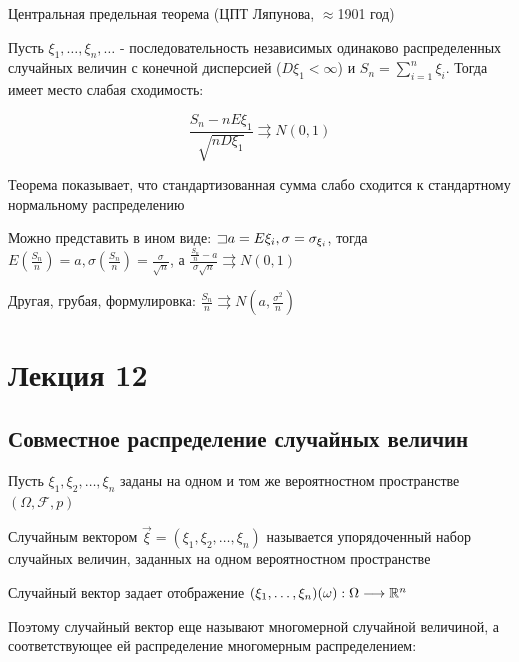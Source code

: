 \documentclass[12pt]{article}
\begin{document}
    \hypertarget{centrallimittheorem}{}

    \begin{MyTheorem}
        \Ths Центральная предельная теорема (ЦПТ Ляпунова, $\approx$1901 год)

        Пусть $\xi_1, \dots, \xi_n, \dots$ - последовательность независимых одинаково распределенных случайных величин
        с конечной дисперсией ($D\xi_1 < \infty$) и $S_n = \sum_{i = 1}^n \xi_i$. Тогда имеет место слабая сходимость:

        \[\frac{S_n - nE\xi_1}{\sqrt{nD\xi_1}} \rightrightarrows N(0, 1)\]
    \end{MyTheorem}

    Теорема показывает, что стандартизованная сумма слабо сходится к стандартному нормальному распределению

    \Nota Можно представить в ином виде: $\mathord{\sqsupset} a = E\xi_i, \sigma = \sigma_{\xi_i}$, тогда $E\left(\frac{S_n}{n}\right) = a, \sigma\left(\frac{S_n}{n}\right) = \frac{\sigma}{\sqrt{n}}$, а $\frac{\frac{S_n}{n} - a}{\sigma \sqrt{n}} \rightrightarrows N(0, 1)$

    \Nota Другая, грубая, формулировка: $\frac{S_n}{n} \rightrightarrows N\left(a, \frac{\sigma^2}{n}\right)$


    \section{Лекция 12}

    \hypertarget{jointdistribution}{}

    \subsection{Совместное распределение случайных величин}

    Пусть $\xi_1, \xi_2, \dots, \xi_n$ заданы на одном и том же вероятностном пространстве $(\Omega, \mathcal{F}, p)$

    \Def Случайным вектором $\vec{\xi} = (\xi_1, \xi_2, \dots, \xi_n)$ называется упорядоченный набор случайных величин, заданных
    на одном вероятностном пространстве

    Случайный вектор задает отображение $(\xi_1, \dots, \xi_n) (\omega) : \Omega \longrightarrow \mathbb{R}^n$

    Поэтому случайный вектор еще называют многомерной случайной величиной, 
    а соответствующее ей распределение многомерным распределением: 
\end{document}

